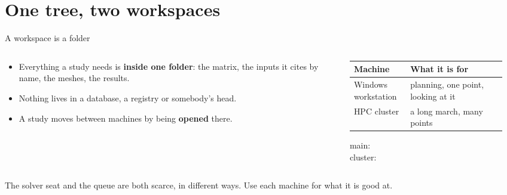 %

\section{One tree, two workspaces}

\begin{frame}{A workspace is a folder}
\begin{columns}[T]
\begin{column}{0.48\textwidth}
\begin{itemize}
  \item Everything a study needs is \textbf{inside one folder}: the matrix,
        the inputs it cites by name, the meshes, the results.
  \item Nothing lives in a database, a registry or somebody's head.
  \item A study moves between machines by being \textbf{opened} there.
\end{itemize}
\end{column}
\begin{column}{0.48\textwidth}
{\ftstablesize
\begin{tabular}{@{}p{0.32\linewidth}p{0.58\linewidth}@{}}
\toprule
\textbf{Machine} & \textbf{What it is for} \\
\midrule
Windows workstation & planning, one point, looking at it \\
HPC cluster & a long march, many points \\
\bottomrule
\end{tabular}}

\vspace{3mm}
{\scriptsize
main: \code{\mainworkspace}\\
cluster: \code{\clusterworkspace}\par}
\end{column}
\end{columns}
\begin{takeaway}The solver seat and the queue are both scarce, in different ways.
Use each machine for what it is good at.\end{takeaway}
\end{frame}

